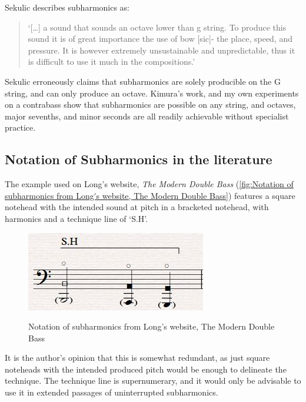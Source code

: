 Sekulic describes subharmonics as:

\begin{quotation}
  `[\ldots] a sound that sounds an octave lower than g string. To produce this sound it is of great importance the use of bow [sic]- the place, speed, and pressure. It is however extremely unsustainable and unpredictable, thus it is difficult to use it much in the compositions.'\autocite[15]{sekulicYouHearMe2012}
\end{quotation}

Sekulic erroneously claims that subharmonics are solely producible on the G string, and can only produce an octave. 
Kimura's work, and my own experiments on a contrabass show that subharmonics are possible on any string, and octaves, major sevenths, and minor seconds are all readily achievable without specialist practice.\autocite[]{kimuraHowProduceSubharmonics1999}

\subsection{Notation of Subharmonics in the literature}

The example used on Long's website, \emph{The Modern Double Bass} (\autoref{fig:Notation of subharmonics from Long's website, The Modern Double Bass}) features a square notehead with the intended sound at pitch in a bracketed notehead, with harmonics and a technique line of `S.H'.\autocite[]{longSubharmonics2019}

\begin{figure}
  \includegraphics[width=\linewidth]{./resources/longSubharmonicNotation.jpg}
  \caption{Notation of subharmonics from Long's website, The Modern Double Bass}\autocite[]{longSubharmonics2019}
\label{fig:Notation of subharmonics from Long's website, The Modern Double Bass}
\end{figure}

It is the author's opinion that this is somewhat redundant, as just square noteheads with the intended produced pitch would be enough to delineate the technique. 
The technique line is supernumerary, and it would only be advisable to use it in extended passages of uninterrupted subharmonics.

